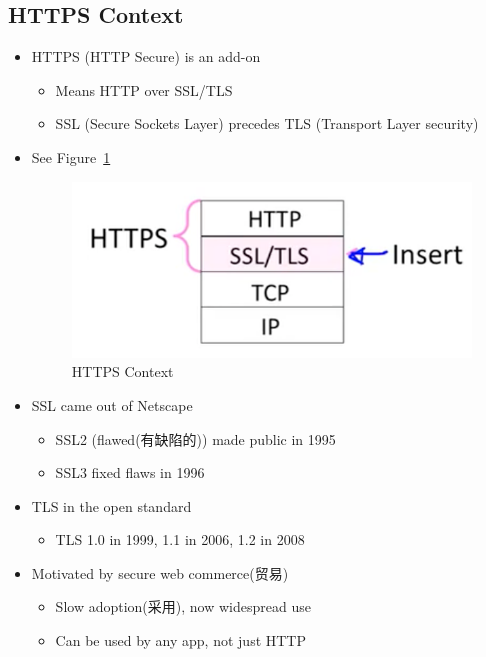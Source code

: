 \documentclass[12pt]{ctexart}   %
\begin{document}
	\subsection{HTTPS Context}
	\begin{itemize}
		\item HTTPS (HTTP Secure) is an add-on
		\begin{itemize}
			\item Means HTTP over SSL/TLS
			\item SSL (Secure Sockets Layer) precedes TLS (Transport Layer security)
		\end{itemize}
		\item See Figure~\ref{fig:10-5-1}
		  
		\begin{figure}[h!] %
		\centering
		\includegraphics[scale=0.7]{images/10-5-1}
		\caption{HTTPS Context}
		\label{fig:10-5-1}
		\end{figure}

		\item SSL came out of Netscape
		\begin{itemize}
			\item SSL2 (flawed(有缺陷的)) made public in 1995
			\item SSL3 fixed flaws in 1996
		\end{itemize}

		\item  TLS in the open standard
		\begin{itemize}
			\item TLS 1.0 in 1999, 1.1 in 2006, 1.2 in 2008
		\end{itemize}

		\item  Motivated by secure web commerce(贸易)
		\begin{itemize}
			\item Slow adoption(采用), now widespread use
			\item Can be used by any app, not just HTTP
		\end{itemize}
	\end{itemize}
\end{document}
